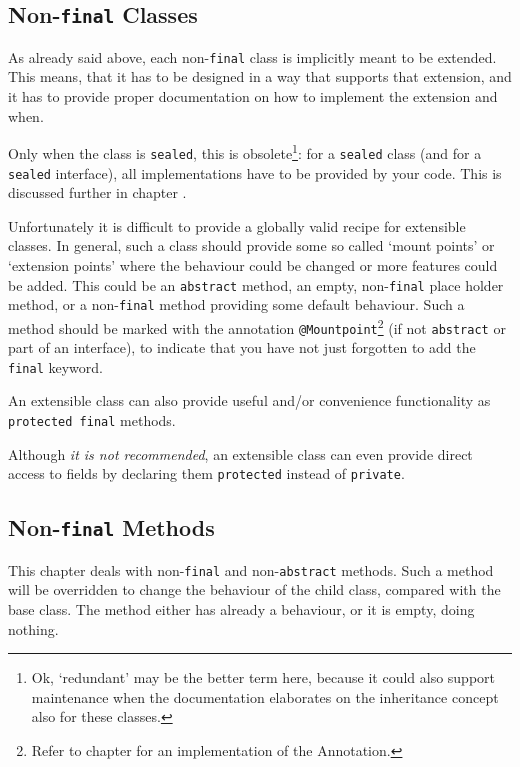 
\subsection{Non-\lstinline|final| Classes}\label{sec:NonFinalClasses}
As already said above, each non-\lstinline|final| class is implicitly meant to be extended. This means, that it has to be designed in a way that supports that extension, and it has to provide proper documentation on how to implement the extension and when.

Only when the class is \lstinline|sealed|\autocite{ORACLE_DOC_LANGUAGE_SPECIFICATION:SealedClasses, ORACLE_DOC_LANGUAGE_SPECIFICATION:SealedInterfaces}, this is obsolete\footnote{Ok, ‘redundant’ may be the better term here, because it could also support maintenance when the documentation elaborates on the inheritance concept also for these classes.}: for a \lstinline|sealed| class (and for a \lstinline|sealed| interface), all implementations have to be provided by your code. This is discussed further in chapter .

Unfortunately it is difficult to provide a globally valid recipe for extensible classes. In general, such a class should provide some so called ‘mount points’ or ‘extension points’ where the behaviour could be changed or more features could be added. This could be an \lstinline|abstract| method, an empty, non-\lstinline|final| place holder method, or a non-\lstinline|final| method providing some default behaviour. Such a method should be marked with the annotation \lstinline|@Mountpoint|\footnote{Refer to chapter  for an implementation of the Annotation.} (if not \lstinline|abstract| or part of an interface), to indicate that you have not just forgotten to add the \lstinline|final| keyword.

An extensible class can also provide useful and/or convenience functionality as \lstinline|protected final| methods. 

Although \textit{it is not recommended}, an extensible class can even provide direct access to fields by declaring them \lstinline|protected| instead of \lstinline|private|.


\subsection{Non-\lstinline|final| Methods}\label{sec:NonFinalMethods}
This chapter deals with non-\lstinline|final| and non-\lstinline|abstract| methods. Such a method will be overridden to change the behaviour of the child class, compared with the base class. The method either has already a behaviour, or it is empty, doing nothing.

